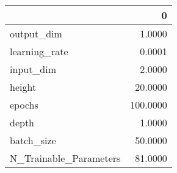 \begin{tabular}{lr}
\toprule
{} &         0 \\
\midrule
output\_dim             &    1.0000 \\
learning\_rate          &    0.0001 \\
input\_dim              &    2.0000 \\
height                 &   20.0000 \\
epochs                 &  100.0000 \\
depth                  &    1.0000 \\
batch\_size             &   50.0000 \\
N\_Trainable\_Parameters &   81.0000 \\
\bottomrule
\end{tabular}
